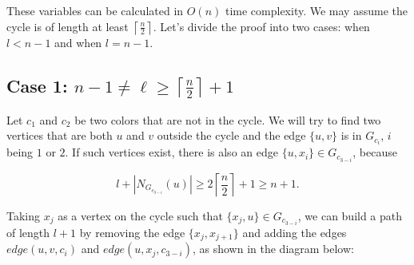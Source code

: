 These variables can be calculated in \( O(n) \) time complexity. We may assume the cycle is of length at least \( \left \lceil \frac{n}{2} \right \rceil \).
Let's divide the proof into two cases: when \( l < n - 1 \) and when \( l = n - 1 \).

\subsection{Case 1: $n - 1 \neq \ell \geq \left \lceil \frac{n}{2} \right \rceil + 1$}

Let $c_1$ and $c_2$ be two colors that are not in the cycle. We will try to find
two vertices that are both $u$ and $v$ outside the cycle and the edge $\{u, v\}$ is in $G_{c_i}$, $i$ being $1$ or $2$.
If such vertices exist, there is also an edge $\{u, x_i\} \in G_{c_{3-i}}$, because

$$
l + |N_{G_{c_{3-i}}}(u)| \geq 2 \left\lceil \frac{n}{2} \right\rceil + 1 \geq n + 1.
$$

Taking $x_j$ as a vertex on the cycle such that $\{x_j, u\} \in G_{c_{3-i}}$, we can build a 
path of length $l + 1$ by removing the edge $\{x_j, x_{j + 1}\}$ and adding the edges $edge(u, v, c_i)$ and 
$edge(u, x_j, c_{3-i})$, as shown in the diagram below:


